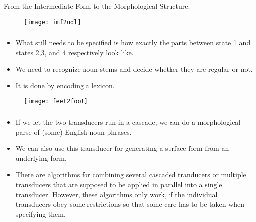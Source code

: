 \begin{frame}

	\frametitle{\insertsection}
	\framesubtitle{\insertsubsection}
	
	From the Intermediate Form to the Morphological Structure.
	
	\begin{figure}
		\texttt{[image: imf2udl]}
	\end{figure}

\end{frame}


\begin{frame}

	\frametitle{\insertsection}
	\framesubtitle{\insertsubsection}
	
	\begin{itemize}
		\item What still needs to be specified is how exactly the parts between state 1 and states 2,3, and 4 respectively look like.
		\item We need to recognize noun stems and decide whether they are regular or not.
		\item It is done by encoding a lexicon.
	\end{itemize}
	
	\begin{figure}
		\texttt{[image: feet2foot]}
	\end{figure}

\end{frame}


\begin{frame}

	\frametitle{\insertsection}
	\framesubtitle{\insertsubsection}
	
	\begin{itemize}
		\item If we let the two transducers run in a cascade, we can do a morphological parse of (some) English noun phrases.
		\item We can also use this transducer for generating a surface form from an underlying form.
		\item There are algorithms for combining several cascaded tranducers or multiple transducers that are supposed to be applied in parallel into a single transducer. However, these algorithms only work, if the individual transducers obey some restrictions so that some care has to be taken when specifying them.
	\end{itemize}
	
\end{frame}


